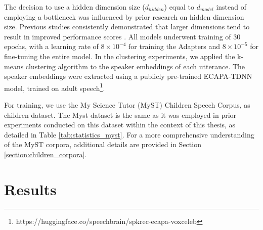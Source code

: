 The decision to use a hidden dimension size ($d_{hidden}$) equal to $d_{model}$ instead of employing a bottleneck was influenced by prior research on hidden dimension size. Previous studies consistently demonstrated that larger dimensions tend to result in improved performance scores \cite{chen2023efficient}. All models underwent training of 30 epochs, with a learning rate of $8 \times 10^{-4}$ for training the Adapters and $8 \times 10^{-5}$ for fine-tuning the entire model. In the clustering experiments, we applied the k-means clustering algorithm to the speaker embeddings of each utterance. The speaker embeddings were extracted using a publicly pre-trained ECAPA-TDNN model, trained on adult speech\footnote{https://huggingface.co/speechbrain/spkrec-ecapa-voxceleb}.

For training, we use the My Science Tutor (MyST) Children Speech Corpus, as children dataset. The Myst dataset is the same as it was employed in prior experiments conducted on this dataset within the context of this thesis, as detailed in Table \ref{tab:statistics_myst}. For a more comprehensive understanding of the MyST corpora, additional details are provided in Section \ref{section:children_corpora}.


\section{Results}
\label{sec:results_adapters}

